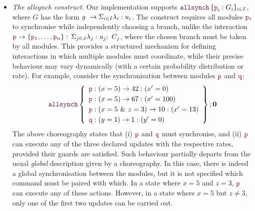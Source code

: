 \begin{itemize}
  The construct enables the expression $(k\ \textit{op}\ i)$, where
  $k$ binds in $u@A[k]$, to identify a set of indices which can then
  be used in the update $u@A[i]$.
  Such set is obtained from the predicate determined by the operator
  $\textit{op}$ with respect to the distinguished index $i$.
  Formally, $(k\ \textit{op}\ i)$ denotes the set
  $\{\, k \in I \mid \textit{op}(k,i) \,\}$.
  For example, $(k \neq i)$ denotes $\{\, k \in I \mid k \neq i \,\}$,
  that is, all defined indices except $i$.

  In essence, the {\sf foreach} construct provides a concise and
  readable way to express operations over multiple indexed modules. It
  can be encoded explicitly by enumerating the modules manually,
  provided that the indices are known at compile time rather than
  determined dynamically at runtime.

\item {\em The {\sf \textcolor{sh_keyword}{allsynch}} construct.} Our
  implementation supports $\allsynch pGiI$, where $G$ has the form
  $g\ \rightarrow \Sigma_{i\in I}\lambda_i: u_i$. The construct requires all modules
  $\nr_i$ to synchronise while independently choosing a branch, unlike
  the interaction $\interact{\nr}{\nr_1,\ldots,\nr_n}$, where the
  chosen branch must be taken by all modules. This provides a
  structured mechanism for defining interactions in which multiple
  modules must coordinate, while their precise behaviour may vary
  dynamically (with a certain probability distribution or rate). For
  example, consider the synchronisation between modules $\role p$ and
  $\role q$:
  \begin{displaymath}
    \allsynchName\left\{
      \begin{array}{lll}
        \nr  : (x=5) \rightarrow 42 : (x'=0) \\[1mm]
        \nr  : (x=5) \rightarrow 67 : (x'=100) \\[1mm]
        \nr  : (x=5\ \&\ z=3) \rightarrow 10 : (x'=13) \\[1mm]
        \nrr : (y=1) \rightarrow 1 : (y'=0)
      \end{array}
    \right\} ; \CEnd
  \end{displaymath}
  The above choreography states that (i) $\nr$ and $\nrr$ must
  synchronise, and (ii) $\nr$ can execute any of the three declared
  updates with the respective rates, provided their guards are
  satisfied. Such behaviour partially departs from the usual {\em
    global} description given by a choreography. In this case, there
  is indeed a global synchronisation between the modules, but it is
  not specified which command must be paired with which. In a state
  where $x=5$ and $z=3$, $\nr$ can execute any of these
  actions. However, in a state where $x=5$ but $z\neq 3$, only one of
  the first two updates can be carried out.


\end{itemize}
